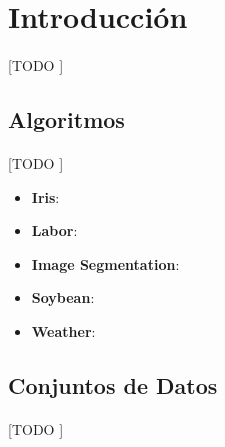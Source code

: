 \documentclass{article}
\begin{document}
	\maketitle %

	\thispagestyle{fancy} %



	\begin{abstract}
		\noindent [TODO]
	\end{abstract}



	\section{Introducción}
	\label{sec:introducción}

		\paragraph{}
		[TODO ]

		\subsection{Algoritmos}

			\paragraph{}
			[TODO ]

			\begin{itemize}
				\item \textbf{Iris}:
				\item	\textbf{Labor}:
				\item	\textbf{Image Segmentation}:
				\item	\textbf{Soybean}:
				\item	\textbf{Weather}:
			\end{itemize}

		\subsection{Conjuntos de Datos}

			\paragraph{}
			[TODO ]
\end{document}
